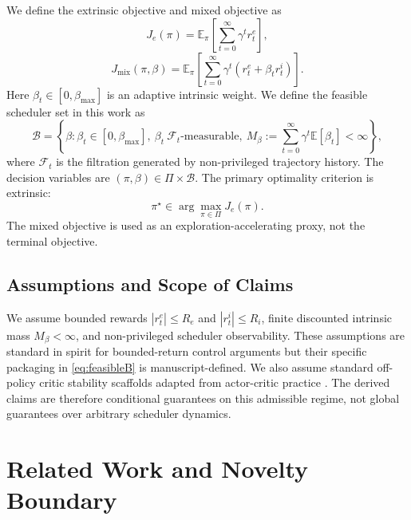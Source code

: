 \documentclass{article} %
\begin{document}
We define the extrinsic objective and mixed objective as
\begin{equation}
\label{eq:Je}
J_e(\pi)=\mathbb{E}_{\pi}\!\left[\sum_{t=0}^{\infty}\gamma^t r_t^e\right],
\end{equation}
\begin{equation}
\label{eq:Jmix}
J_{\mathrm{mix}}(\pi,\beta)=\mathbb{E}_{\pi}\!\left[\sum_{t=0}^{\infty}\gamma^t\left(r_t^e+\beta_t r_t^i\right)\right].
\end{equation}
Here $\beta_t\in[0,\beta_{\max}]$ is an adaptive intrinsic weight. We define the feasible scheduler set in this work as
\begin{equation}
\label{eq:feasibleB}
\mathcal{B}=\left\{\beta:\beta_t\in[0,\beta_{\max}],\ \beta_t\ \mathcal{F}_t\text{-measurable},\ M_\beta:=\sum_{t=0}^{\infty}\gamma^t\mathbb{E}[\beta_t]<\infty\right\},
\end{equation}
where $\mathcal{F}_t$ is the filtration generated by non-privileged trajectory history. The decision variables are $(\pi,\beta)\in\Pi\times\mathcal{B}$. The primary optimality criterion is extrinsic:
\begin{equation}
\label{eq:pi_star}
\pi^\star\in\arg\max_{\pi\in\Pi}J_e(\pi).
\end{equation}
The mixed objective is used as an exploration-accelerating proxy, not the terminal objective.

\subsection{Assumptions and Scope of Claims}

We assume bounded rewards $|r_t^e|\le R_e$ and $|r_t^i|\le R_i$, finite discounted intrinsic mass $M_\beta<\infty$, and non-privileged scheduler observability. These assumptions are standard in spirit for bounded-return control arguments but their specific packaging in \eqref{eq:feasibleB} is manuscript-defined. We also assume standard off-policy critic stability scaffolds adapted from actor-critic practice \citep{arxiv1509_02971, arxiv1707_06347, arxiv1802_09477, arxiv1801_01290}. The derived claims are therefore conditional guarantees on this admissible regime, not global guarantees over arbitrary scheduler dynamics.

\section{Related Work and Novelty Boundary}
\label{sec:related}
\end{document}
